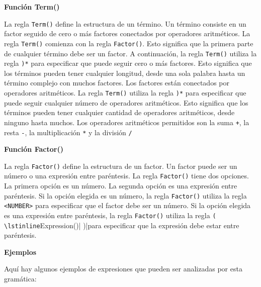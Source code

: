 \phantom{text}

\noindent \textbf{Función Term()}

\phantom{text}

\lstset{inputencoding=utf8/latin1}


\noindent La regla \lstinline|Term()| define la estructura de un término. Un término consiste en un factor seguido de cero o más factores conectados por operadores aritméticos. La regla \lstinline|Term()| comienza con la regla \lstinline|Factor()|. Esto significa que la primera parte de cualquier término debe ser un factor. A continuación, la regla \lstinline|Term()| utiliza la regla \lstinline|)*| para especificar que puede seguir cero o más factores. Esto significa que los términos pueden tener cualquier longitud, desde una sola palabra hasta un término complejo con muchos factores.
Los factores están conectados por operadores aritméticos. La regla \lstinline|Term()| utiliza la regla \lstinline|)*| para especificar que puede seguir cualquier número de operadores aritméticos. Esto significa que los términos pueden tener cualquier cantidad de operadores aritméticos, desde ninguno hasta muchos.
Los operadores aritméticos permitidos son la suma \lstinline|+|, la resta \lstinline|-|, la multiplicación \lstinline|*| y la división \lstinline|/|

\phantom{text}

\noindent \textbf{Función Factor()}

\phantom{text}

\lstset{inputencoding=utf8/latin1}

\noindent La regla \lstinline|Factor()| define la estructura de un factor. Un factor puede ser un número o una expresión entre paréntesis. La regla \lstinline|Factor()| tiene dos opciones. La primera opción es un número. La segunda opción es una expresión entre paréntesis. Si la opción elegida es un número, la regla \lstinline|Factor()| utiliza la regla \lstinline[keywordstyle=\color{black}]|<NUMBER>| para especificar que el factor debe ser un número. Si la opción elegida es una expresión entre paréntesis, la regla \lstinline|Factor()| utiliza la regla \lstinline|( \lstinline|Expression()| )|para especificar que la expresión debe estar entre paréntesis.

\phantom{text}

\noindent \textbf{Ejemplos}

\phantom{text}

\noindent Aquí hay algunos ejemplos de expresiones que pueden ser analizadas por esta gramática:

